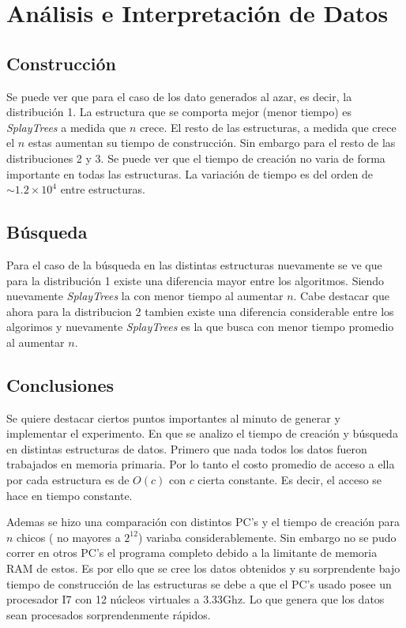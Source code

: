 \documentclass[letterpaper,12pt]{article}
\begin{document}
\section{An\'alisis e Interpretaci\'on de Datos}
 \subsection{Construcción}

Se puede ver que para el caso de los dato generados al azar, es decir, la distribución 1. La estructura que se comporta mejor (menor tiempo) es \textit{SplayTrees} a medida que $n$ crece. El resto de las estructuras, a medida que crece el $n$ estas aumentan su tiempo de construcción. Sin embargo para el resto de las distribuciones 2 y 3. Se puede ver que el tiempo de creación no varia de forma importante en todas las estructuras. La variación de tiempo es del orden de  $\sim 1.2\times10^4$ entre estructuras. 
 
 

 
\subsection{Búsqueda}

Para el caso de la búsqueda en las distintas estructuras nuevamente se ve que para la distribución 1 existe una diferencia mayor entre los algoritmos. Siendo nuevamente \textit{SplayTrees} la con menor tiempo al aumentar $n$. 
Cabe destacar que ahora para la distribucion 2 tambien existe una diferencia considerable entre los algorimos y nuevamente \textit{SplayTrees} es la que busca con menor tiempo promedio al aumentar $n$. 
 
\subsection{Conclusiones} 
Se quiere destacar ciertos puntos importantes al minuto de generar y implementar el experimento. En que se analizo el tiempo de creación y búsqueda en distintas estructuras de datos.
Primero que nada todos los datos fueron trabajados en memoria primaria. Por lo tanto el costo promedio de acceso a ella por cada estructura es de $O(c)$ con $c$ cierta constante. Es decir, el acceso se hace en tiempo constante.

Ademas se hizo una comparación con distintos PC's y el tiempo de creación para $n$ chicos ( no mayores a $2^12$) variaba considerablemente. Sin embargo no se pudo correr en otros PC's el programa completo debido a la limitante de memoria RAM de estos. Es por ello que se cree los datos obtenidos y su sorprendente bajo tiempo de construcción de las estructuras se debe a que el PC's usado posee un procesador I7 con 12 núcleos virtuales a 3.33Ghz. Lo que genera que los datos sean procesados sorprendenmente rápidos.  
\end{document}
